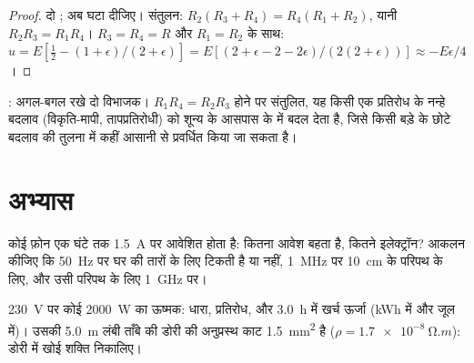 \begin{proof}
दो ; अब घटा दीजिए। संतुलन: $R_2(R_3 + R_4) = R_4(R_1 +
R_2)$, यानी $R_2R_3 = R_1R_4$। $R_3 = R_4 = R$ और $R_1 = R_2$ के साथ:
$u = E[\tfrac12 - (1 + \epsilon)/(2 + \epsilon)] = E[(2 + \epsilon - 2 -
2\epsilon)/(2(2 + \epsilon))] \approx -E\epsilon/4$।
\end{proof}

\begin{omfigure}

{\small {}: अगल-बगल रखे दो विभाजक। $R_1R_4 = R_2R_3$ होने पर
संतुलित, यह किसी एक प्रतिरोध के नन्हे बदलाव (विकृति-मापी, तापप्रतिरोधी) को
शून्य के आसपास के  में बदल देता है, जिसे किसी बड़े  के छोटे
बदलाव की तुलना में कहीं आसानी से प्रवर्धित किया जा सकता है।}
\end{omfigure}

\section{अभ्यास}

\begin{exercise}[$\star$]\label{exo:b1:dc-circuits:1}
कोई फ़ोन एक घंटे तक \qty{1.5}{A} पर आवेशित होता है: कितना आवेश बहता है, कितने
इलेक्ट्रॉन? आकलन कीजिए कि  \qty{50}{Hz} पर घर की तारों के
लिए टिकती है या नहीं, \qty{1}{MHz} पर \qty{10}{cm} के परिपथ के लिए, और उसी
परिपथ के लिए \qty{1}{GHz} पर।
\end{exercise}

\begin{exercise}[$\star$]\label{exo:b1:dc-circuits:2}
\qty{230}{V} पर कोई \qty{2000}{W} का ऊष्मक: धारा, प्रतिरोध, और \qty{3.0}{h}
में खर्च ऊर्जा (kWh में और जूल में)। उसकी \qty{5.0}{m} लंबी ताँबे की डोरी की
अनुप्रस्थ काट \qty{1.5}{mm^2} है ($\rho = \qty{1.7e-8}{\ohm.m}$):
डोरी में खोई शक्ति निकालिए।
\end{exercise}

